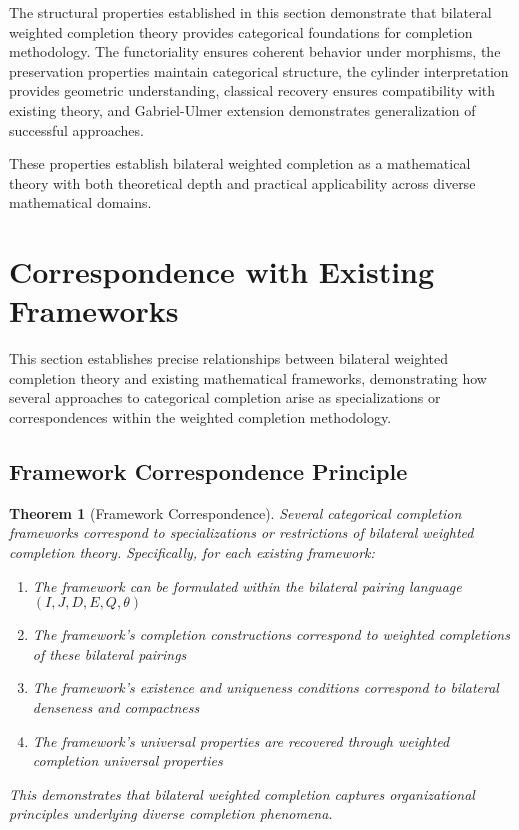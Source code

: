\documentclass[11pt]{article}
\theoremstyle{plain}
\newtheorem{theorem}{Theorem}[section]
\theoremstyle{definition}
\theoremstyle{remark}
\begin{document}
The structural properties established in this section demonstrate that bilateral weighted completion theory provides categorical foundations for completion methodology. The functoriality ensures coherent behavior under morphisms, the preservation properties maintain categorical structure, the cylinder interpretation provides geometric understanding, classical recovery ensures compatibility with existing theory, and Gabriel-Ulmer extension demonstrates generalization of successful approaches.

These properties establish bilateral weighted completion as a mathematical theory with both theoretical depth and practical applicability across diverse mathematical domains.

\section{Correspondence with Existing Frameworks}

This section establishes precise relationships between bilateral weighted completion theory and existing mathematical frameworks, demonstrating how several approaches to categorical completion arise as specializations or correspondences within the weighted completion methodology.

\subsection{Framework Correspondence Principle}

\begin{theorem}[Framework Correspondence]\label{thm:framework-unification}
Several categorical completion frameworks correspond to specializations or restrictions of bilateral weighted completion theory. Specifically, for each existing framework:

\begin{enumerate}
\item The framework can be formulated within the bilateral pairing language $(I, J, D, E, Q, \theta)$
\item The framework's completion constructions correspond to weighted completions of these bilateral pairings
\item The framework's existence and uniqueness conditions correspond to bilateral denseness and compactness
\item The framework's universal properties are recovered through weighted completion universal properties
\end{enumerate}

This demonstrates that bilateral weighted completion captures organizational principles underlying diverse completion phenomena.
\end{theorem}
\end{document}
